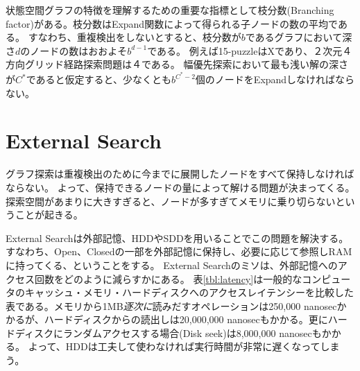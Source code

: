 \documentclass[b5paper]{report}
\begin{document}
状態空間グラフの特徴を理解するための重要な指標として枝分数(Branching factor)がある。枝分数はExpand関数によって得られる子ノードの数の平均である。
すなわち、重複検出をしないとすると、枝分数が$b$であるグラフにおいて深さ$d$のノードの数はおおよそ$b^{d-1}$である。
例えば15-puzzleはXであり、２次元４方向グリッド経路探索問題は４である。
幅優先探索において最も浅い解の深さが$C^*$であると仮定すると、少なくとも$b^{C^*-2}$個のノードをExpandしなければならない。



\section{External Search}
\label{sec:external-search}


グラフ探索は重複検出のために今までに展開したノードをすべて保持しなければならない。
よって、保持できるノードの量によって解ける問題が決まってくる。
探索空間があまりに大きすぎると、ノードが多すぎてメモリに乗り切らないということが起きる。

External Searchは外部記憶、HDDやSDDを用いることでこの問題を解決する。
すなわち、Open、Closedの一部を外部記憶に保持し、必要に応じて参照しRAMに持ってくる、ということをする。
External Searchのミソは、外部記憶へのアクセス回数をどのように減らすかにある。
表\ref{tbl:latency}は一般的なコンピュータのキャッシュ・メモリ・ハードディスクへのアクセスレイテンシーを比較した表である。メモリから1MB{\it 逐次に}読みだすオペレーションは250,000 nanosecかかるが、ハードディスクからの読出しは20,000,000 nanosecもかかる。更にハードディスクにランダムアクセスする場合(Disk seek)は8,000,000 nanosecもかかる。
よって、HDDは工夫して使わなければ実行時間が非常に遅くなってしまう。%
\end{document}
